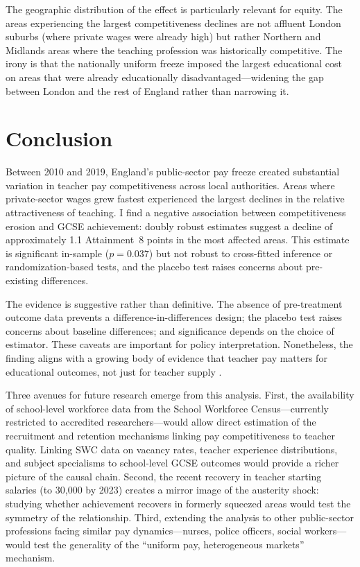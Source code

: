 \documentclass[12pt]{article}
\begin{document}
The geographic distribution of the effect is particularly relevant for equity. The areas experiencing the largest competitiveness declines are not affluent London suburbs (where private wages were already high) but rather Northern and Midlands areas where the teaching profession was historically competitive. The irony is that the nationally uniform freeze imposed the largest educational cost on areas that were already educationally disadvantaged---widening the gap between London and the rest of England rather than narrowing it.

\section{Conclusion}\label{sec:conclusion}

Between 2010 and 2019, England's public-sector pay freeze created substantial variation in teacher pay competitiveness across local authorities. Areas where private-sector wages grew fastest experienced the largest declines in the relative attractiveness of teaching. I find a negative association between competitiveness erosion and GCSE achievement: doubly robust estimates suggest a decline of approximately 1.1 Attainment~8 points in the most affected areas. This estimate is significant in-sample ($p = 0.037$) but not robust to cross-fitted inference or randomization-based tests, and the placebo test raises concerns about pre-existing differences.

The evidence is suggestive rather than definitive. The absence of pre-treatment outcome data prevents a difference-in-differences design; the placebo test raises concerns about baseline differences; and significance depends on the choice of estimator. These caveats are important for policy interpretation. Nonetheless, the finding aligns with a growing body of evidence that teacher pay matters for educational outcomes, not just for teacher supply \citep{hanushek2011economic, dolton2011if, hendricks2014relative}.

Three avenues for future research emerge from this analysis. First, the availability of school-level workforce data from the School Workforce Census---currently restricted to accredited researchers---would allow direct estimation of the recruitment and retention mechanisms linking pay competitiveness to teacher quality. Linking SWC data on vacancy rates, teacher experience distributions, and subject specialisms to school-level GCSE outcomes would provide a richer picture of the causal chain. Second, the recent recovery in teacher starting salaries (to \textsterling{} 30,000 by 2023) creates a mirror image of the austerity shock: studying whether achievement recovers in formerly squeezed areas would test the symmetry of the relationship. Third, extending the analysis to other public-sector professions facing similar pay dynamics---nurses, police officers, social workers---would test the generality of the ``uniform pay, heterogeneous markets'' mechanism.
\end{document}
